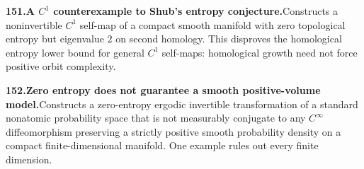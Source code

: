 \documentclass[11pt,a4paper]{article}
\begin{document}
  \par \begin{minipage}{\linewidth}
  \fontsize{10.5}{12.6}\selectfont\RaggedRight
  \hypertarget{result 151}{}
  {\bfseries\textcolor{muted}{151.}\enspace A $C^1$ counterexample to Shub’s entropy conjecture.}\enspace Constructs a noninvertible $C^1$ self-map of a compact smooth manifold with zero topological entropy but eigenvalue $2$ on second homology. This disproves the homological entropy lower bound for general $C^1$ self-maps: homological growth need not force positive orbit complexity.\par
  \end{minipage}\par\vspace{5pt}



  \par \begin{minipage}{\linewidth}
  \fontsize{10.5}{12.6}\selectfont\RaggedRight
  \hypertarget{result 152}{}
  {\bfseries\textcolor{muted}{152.}\enspace Zero entropy does not guarantee a smooth positive-volume model.}\enspace Constructs a zero-entropy ergodic invertible transformation of a standard nonatomic probability space that is not measurably conjugate to any $C^\infty$ diffeomorphism preserving a strictly positive smooth probability density on a compact finite-dimensional manifold. One example rules out every finite dimension.\par
  \end{minipage}\par\vspace{5pt}
\end{document}

